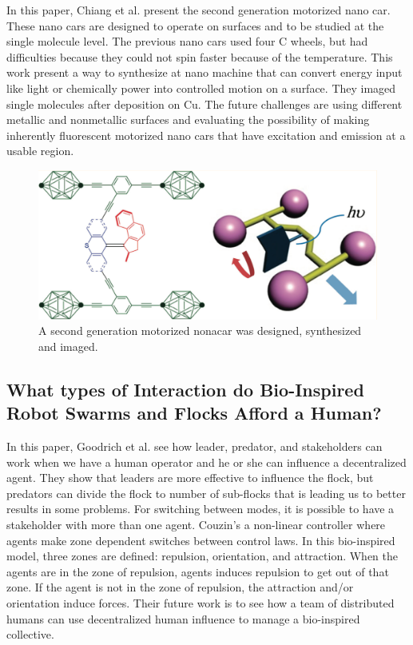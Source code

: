 \documentclass[letterpaper, 10 pt, conference]{ieeeconf}
\begin{document}
In this paper, Chiang et al. present the second generation motorized nano car.\cite{TourNanocar2012} These nano cars are designed to operate on surfaces and to be studied at the single molecule level. The previous nano cars used four C wheels, but had difficulties because they could not spin faster because of the temperature. This work present a way to synthesize at nano machine that can convert energy input like light or chemically power into controlled motion on a surface. They imaged single molecules after deposition on Cu. The future challenges are using different metallic and nonmetallic surfaces and evaluating the possibility of making inherently fluorescent motorized nano cars that have excitation and emission at a usable region. 
\begin{figure}[h]
\begin{center}
\includegraphics[width=\columnwidth]{nanocar.png}
\caption{A second generation motorized nonacar was designed, synthesized and imaged.\cite{TourNanocar2012}
\label{fig:nanocar}}
\end{center}
\end{figure}
\subsection{What types of Interaction do Bio-Inspired Robot Swarms and Flocks Afford a Human?}

In this paper, Goodrich et al. see how leader, predator, and stakeholders can work when we have a human operator and he or she can influence a decentralized agent.\cite{Goodrich2012} They show that leaders are more effective to influence the flock, but predators can divide the flock to number of sub-flocks that is leading us to better results in some problems. For switching between modes, it is possible to have a stakeholder with more than one agent. Couzin's a non-linear controller where agents make zone dependent switches between control laws. In this bio-inspired model, three zones are defined: repulsion, orientation, and attraction. When the agents are in the zone of repulsion, agents induces repulsion to get out of that zone. If the agent is not in the zone of repulsion, the attraction and/or orientation induce forces. Their future work is to see how a team of distributed humans can use decentralized human influence to manage a bio-inspired collective.
\end{document}
